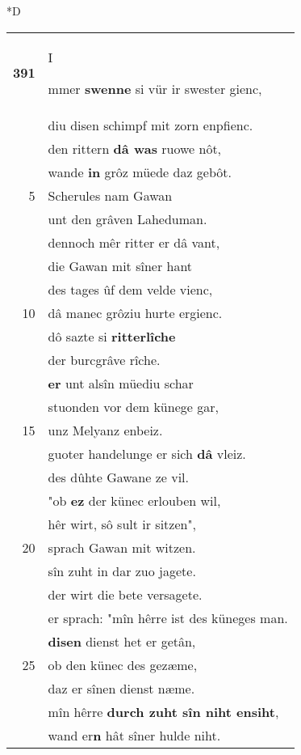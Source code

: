 \documentclass[8pt,a4paper,notitlepage]{article}
\begin{document}
\begin{table}[ht]
\begin{minipage}[t]{0.5\linewidth}
\small
\begin{center}*D
\end{center}
\begin{tabular}{rl}
\textbf{391} & \begin{large}I\end{large}mmer \textbf{swenne} si vür ir swester gienc,\\ 
 & diu disen schimpf mit zorn enpfienc.\\ 
 & den rittern \textbf{dâ was} ruowe nôt,\\ 
 & wande \textbf{in} grôz müede daz gebôt.\\ 
5 & Scherules nam Gawan\\ 
 & unt den grâven Laheduman.\\ 
 & dennoch mêr ritter er dâ vant,\\ 
 & die Gawan mit sîner hant\\ 
 & des tages ûf dem velde vienc,\\ 
10 & dâ manec grôziu hurte ergienc.\\ 
 & dô sazte si \textbf{ritterlîche}\\ 
 & der burcgrâve rîche.\\ 
 & \textbf{er} unt alsîn müediu schar\\ 
 & stuonden vor dem künege gar,\\ 
15 & unz Melyanz enbeiz.\\ 
 & guoter handelunge er sich \textbf{dâ} vleiz.\\ 
 & des dûhte Gawane ze vil.\\ 
 & "ob \textbf{ez} der künec erlouben wil,\\ 
 & hêr wirt, sô sult ir sitzen",\\ 
20 & sprach Gawan mit witzen.\\ 
 & sîn zuht in dar zuo jagete.\\ 
 & der wirt die bete versagete.\\ 
 & er sprach: "mîn hêrre ist des küneges man.\\ 
 & \textbf{disen} dienst het er getân,\\ 
25 & ob den künec des gezæme,\\ 
 & daz er sînen dienst næme.\\ 
 & mîn hêrre \textbf{durch zuht sîn niht ensiht},\\ 
 & wand er\textbf{n} hât sîner hulde niht.\\ 

\end{tabular}
\end{minipage}
\end{table}
\end{document}
